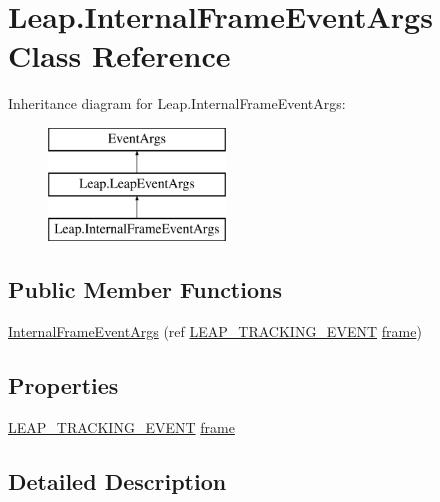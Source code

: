 \hypertarget{class_leap_1_1_internal_frame_event_args}{}\section{Leap.\+Internal\+Frame\+Event\+Args Class Reference}
\label{class_leap_1_1_internal_frame_event_args}
Inheritance diagram for Leap.\+Internal\+Frame\+Event\+Args\+:\begin{figure}[H]
\begin{center}
\leavevmode
\includegraphics[height=3.000000cm]{class_leap_1_1_internal_frame_event_args}
\end{center}
\end{figure}
\subsection*{Public Member Functions}
\begin{DoxyCompactItemize}
\item 
\mbox{\hyperlink{class_leap_1_1_internal_frame_event_args_afdcf6e8d248995894975396c3b1fa9a8}{Internal\+Frame\+Event\+Args}} (ref \mbox{\hyperlink{struct_leap_internal_1_1_l_e_a_p___t_r_a_c_k_i_n_g___e_v_e_n_t}{L\+E\+A\+P\+\_\+\+T\+R\+A\+C\+K\+I\+N\+G\+\_\+\+E\+V\+E\+NT}} \mbox{\hyperlink{class_leap_1_1_internal_frame_event_args_ad4466ce1fb0119ae61135dd8a1f7d966}{frame}})
\end{DoxyCompactItemize}
\subsection*{Properties}
\begin{DoxyCompactItemize}
\item 
\mbox{\hyperlink{struct_leap_internal_1_1_l_e_a_p___t_r_a_c_k_i_n_g___e_v_e_n_t}{L\+E\+A\+P\+\_\+\+T\+R\+A\+C\+K\+I\+N\+G\+\_\+\+E\+V\+E\+NT}} \mbox{\hyperlink{class_leap_1_1_internal_frame_event_args_ad4466ce1fb0119ae61135dd8a1f7d966}{frame}}
\end{DoxyCompactItemize}


\subsection{Detailed Description}


